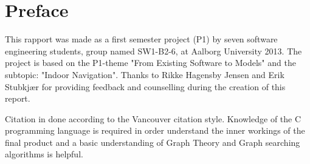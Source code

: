 \chapter*{Preface}
This rapport was made as a first semester project (P1) by seven software engineering students,
group named SW1-B2-6, at Aalborg University 2013. The project is based
on the P1-theme "From Existing Software to Models" and the subtopic: "Indoor Navigation".
Thanks to Rikke Hagensby Jensen and Erik Stubkjær for providing feedback and counselling during the creation of this report.


Citation in done according to the Vancouver citation style. Knowledge of the C programming language is required in
order understand the inner workings of the final product and a basic understanding of Graph Theory and Graph searching algorithms is helpful.